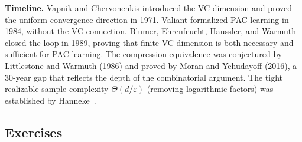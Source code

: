 \begin{historical}
\textbf{Timeline.}  Vapnik and Chervonenkis introduced the VC dimension and
proved the uniform convergence direction in 1971.  Valiant formalized PAC
learning in 1984, without the VC connection.  Blumer, Ehrenfeucht, Haussler,
and Warmuth closed the loop in 1989, proving that finite VC dimension is both
necessary and sufficient for PAC learning.  The compression equivalence was
conjectured by Littlestone and Warmuth (1986) and proved by Moran and
Yehudayoff (2016), a 30-year gap that reflects the depth of the combinatorial
argument.  The tight realizable sample complexity $\Theta(d/\varepsilon)$
(removing logarithmic factors) was established by
Hanneke~\cite{Hanneke2016}.
\end{historical}



\subsection*{Exercises}

